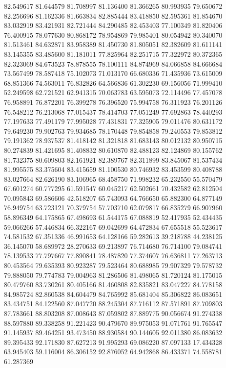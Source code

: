 82.549617
81.644579
81.708997
81.136400
81.366265
80.993935
79.650672
82.256696
81.162336
81.663834
82.885444
83.418850
82.595361
81.854670
83.032919
83.421931
82.721444
84.290485
82.453403
77.100349
81.820406
76.400915
78.077630
80.868172
78.954869
79.985401
80.054942
80.340070
81.513461
84.632871
83.958389
81.450730
81.805051
82.382609
81.611141
83.145355
83.485600
81.181011
77.825964
82.251715
77.322972
80.372365
82.323069
84.673523
78.878555
78.100111
84.874969
84.066858
84.666684
73.567499
78.587418
75.102073
71.013170
66.680336
71.435936
73.615009
68.851366
74.563011
76.832826
64.566836
61.302230
69.156056
71.999410
52.249598
62.721521
62.941315
70.063783
63.595073
72.114496
77.457078
76.958891
76.872201
76.399278
76.396520
75.994758
76.311923
76.201126
76.548212
76.213068
77.015437
78.414703
77.051249
77.692863
78.440293
77.197633
77.491179
77.995028
77.431831
77.325905
79.011476
80.631172
79.649230
79.902763
79.934685
78.170448
79.854858
79.240553
79.853812
79.191362
78.937537
81.418142
81.321818
81.683143
80.012132
80.950715
80.274839
81.421695
81.408832
80.610870
82.488123
82.124869
80.155762
81.732375
80.609803
82.161921
82.389767
82.311899
83.845067
81.537434
81.995575
83.375604
83.415659
81.100530
80.746932
83.453599
80.408788
83.027664
82.626190
83.106965
68.458750
71.998232
65.232550
55.570479
67.601274
60.777295
61.591547
60.045217
62.502661
70.432582
62.812504
70.095843
69.586606
42.518207
65.743093
64.766650
65.882300
64.877149
76.949754
63.723121
70.379754
57.703710
62.079817
66.835279
66.907960
58.896349
64.175865
67.498693
61.544175
67.088819
52.417935
52.434435
59.066266
57.446834
66.322167
69.042699
64.472834
67.655518
55.523617
74.581532
67.351336
46.991653
64.128166
59.282613
39.218788
44.238125
36.145070
58.689972
28.270633
69.213897
76.714680
76.714100
79.084741
78.139533
77.797667
77.890841
78.487820
77.374607
76.636811
77.263713
80.453564
79.635393
80.923287
79.523464
80.688985
79.907329
79.578732
79.888050
79.774783
79.004963
81.286506
81.498065
81.720124
81.175015
80.479760
83.730261
80.405166
81.460808
82.835821
83.047227
84.778158
84.985724
82.860538
84.604479
84.765992
85.681404
85.306822
86.083651
83.434751
84.122560
87.047720
88.245304
87.716112
87.571891
87.709803
87.783661
88.803208
87.008643
87.059802
87.889775
90.056674
91.274338
88.597880
89.338258
91.221423
90.479670
89.975053
91.071761
91.765547
91.145937
89.464251
93.473450
88.930584
90.144605
92.011380
86.083632
89.395433
92.171830
87.627213
91.995293
69.086220
87.097133
17.434328
63.945403
59.116004
86.306152
92.876052
64.942868
86.433371
74.558781
61.287369

